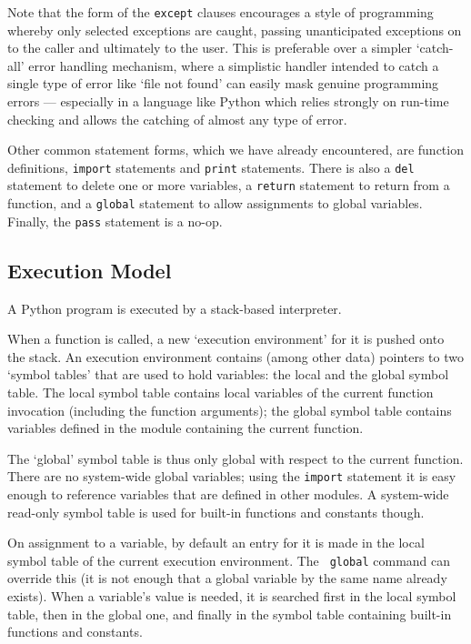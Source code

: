 Note that the form of the {\tt except} clauses encourages a style of
programming whereby only selected exceptions are caught, passing
unanticipated exceptions on to the caller and ultimately to the user.
This is preferable over a simpler `catch-all' error handling
mechanism, where a simplistic handler intended to catch a single type
of error like `file not found' can easily mask genuine programming
errors --- especially in a language like Python which relies strongly
on run-time checking and allows the catching of almost any type of
error.

Other common statement forms, which we have already encountered, are
function definitions, {\tt import} statements and {\tt print}
statements.  There is also a {\tt del} statement to delete one or more
variables, a {\tt return} statement to return from a function, and a
{\tt global} statement to allow assignments to global variables.
Finally, the {\tt pass} statement is a no-op.

\subsection{Execution Model}

A Python program is executed by a stack-based interpreter.

When a function is called, a new `execution environment' for it is
pushed onto the stack.  An execution environment contains (among other
data) pointers to two `symbol tables' that are used to hold variables:
the local and the global symbol table.  The local symbol table
contains local variables of the current function invocation (including
the function arguments); the global symbol table contains variables
defined in the module containing the current function.

The `global' symbol table is thus only global with respect to the
current function.  There are no system-wide global variables; using
the {\tt import} statement it is easy enough to reference variables
that are defined in other modules.  A system-wide read-only symbol
table is used for built-in functions and constants though.

On assignment to a variable, by default an entry for it is made in the
local symbol table of the current execution environment.  The {\tt
global} command can override this (it is not enough that a global
variable by the same name already exists).  When a variable's value is
needed, it is searched first in the local symbol table, then in the
global one, and finally in the symbol table containing built-in
functions and constants.

